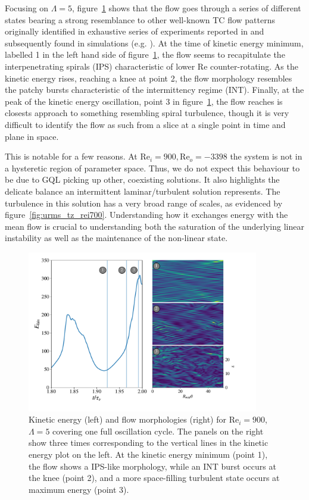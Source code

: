 \documentclass[openacc]{rstransa}%
\newcommand{\Reyn}{\mathrm{Re}}
\begin{document}
Focusing on $\Lambda=5$, figure~\ref{fig:rei900_lambda5_story} shows that the flow goes through a series of different states bearing a strong resemblance to other well-known TC flow patterns originally identified in exhaustive series of experiments reported in \cite{1984JFM...146...45M} and subsequently found in simulations (e.g. \cite{2009PhRvE..80d6315M}). At the time of kinetic energy minimum, labelled 1 in the left hand side of figure~\ref{fig:rei900_lambda5_story}, the flow seems to recapitulate the interpenetrating spirals (IPS) characteristic of lower $\Reyn$ counter-rotating. As the kinetic energy rises, reaching a knee at point 2, the flow morphology resembles the patchy bursts characteristic of the intermittency regime (INT). Finally, at the peak of the kinetic energy oscillation, point 3 in figure~\ref{fig:rei900_lambda5_story}, the flow reaches is closests approach to something resembling spiral turbulence, though it is very difficult to identify the flow as such from a slice at a single point in time and plane in space.

This is notable for a few reasons. At $\Reyn_i=900, \Reyn_o=-3398$ the system is not in a hysteretic region of parameter space. Thus, we do not expect this behaviour to be due to GQL picking up other, coexisting solutions. 
It also highlights the delicate balance an intermittent laminar/turbulent solution represents. The turbulence in this solution has a very broad range of scales, as evidenced by figure~\ref{fig:urms_tz_rei700}. Understanding how it exchanges energy with the mean flow is crucial to understanding both the saturation of the underlying linear instability as well as the maintenance of the non-linear state. 
\begin{figure}
    \centering
    \includegraphics[width=0.9\textwidth]{figs/rei900_story.pdf}
    \caption{Kinetic energy (left) and flow morphologies (right) for $\Reyn_i = 900$, $\Lambda = 5$ covering one full oscillation cycle. The panels on the right show three times corresponding to the vertical lines in the kinetic energy plot on the left. At the kinetic energy minimum (point 1), the flow shows a IPS-like morphology, while an INT burst occurs at the knee (point 2), and a more space-filling turbulent state occurs at maximum energy (point 3).}
    \label{fig:rei900_lambda5_story}
\end{figure}
\end{document}
